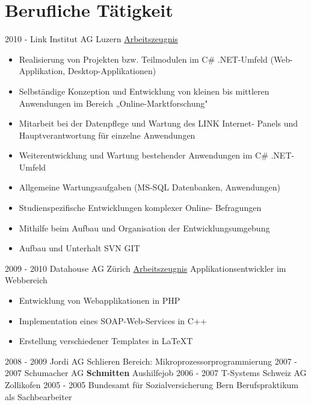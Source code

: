 \documentclass[letterpaper]{twentysecondcv} %
\begin{document}
\makeprofile %
\section{Berufliche Tätigkeit}
\begin{twenty}
	\hypertarget{link2_back}{}
	\twentyitem
    	{2010 -}
        {}
        {Link Institut AG \textnormal{Luzern}}
        {\hyperlink{link2}{Arbeitszeugnis}}
        {}
        {\begin{itemize}
\item Realisierung von Projekten bzw. Teilmodulen im C\# .NET-Umfeld
(Web-Applikation, Desktop-Applikationen)
\item Selbständige Konzeption und Entwicklung von kleinen bis
mittleren Anwendungen im Bereich „Online-Marktforschung"
\item Mitarbeit bei der Datenpflege und Wartung des LINK Internet-
Panels und Hauptverantwortung für einzelne Anwendungen
\item Weiterentwicklung und Wartung bestehender Anwendungen im
C\# .NET-Umfeld
\item Allgemeine Wartungsaufgaben (MS-SQL Datenbanken,
Anwendungen)
\item Studienspezifische Entwicklungen komplexer Online-
Befragungen
\item Mithilfe beim Aufbau und Organisation der
Entwicklungsumgebung
\item Aufbau und Unterhalt SVN \/ GIT
	\end{itemize}}
	\twentyitem
    	{}
        {}
        {}
        {}
        {}
        {}
	\twentyitem
    	{2009 - 2010}
        {}
        {Datahouse AG \textnormal{Zürich}}
        {\hyperref[sec:hello]{Arbeitszeugnis}}
        {Applikationsentwickler im Webbereich}
        {
		\begin{itemize}
		\item Entwicklung von Webapplikationen in PHP
		\item Implementation eines SOAP-Web-Services in C++
		\item Erstellung verschiedener Templates in LaTeXT
		\end{itemize}
	}	
	\twentyitem
    	{}
        {}
        {}
        {}
        {}
        {}
	\twentyitem
    	{2008 - 2009}
        {}
        {Jordi AG \textnormal{Schlieren}}
        {\hyperref[sec:hello]{\color{pblue}{Arbeitszeugnis}}}
        {Bereich: Mikroprozessorprogrammierung}
        {}
	\twentyitem
    	{2007 - 2007}
        {}
        {Schumacher AG \textbf{Schmitten}}
        {}
        {Aushilfejob}
        {}
	\twentyitem
    	{2006 - 2007}
        {}
        {T-Systems Schweiz AG \textnormal{Zollikofen}}
        {\hyperref[sec:hello]{\color{pblue}{\color{pblue}{Arbeitszeugnis}}}}
        {}
        {}
	\twentyitem
    	{2005 - 2005}
        {}
        {Bundesamt für Sozialversicherung \textnormal{Bern}}
        {\hyperref[sec:hello]{\color{pblue}{\color{pblue}{Arbeitszeugnis}}}}
        {Berufspraktikum als Sachbearbeiter}
        {}


\end{twenty}
\end{document}
